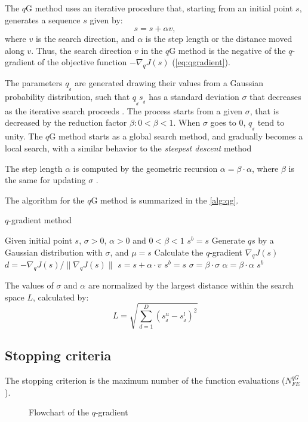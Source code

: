 The $q$G method uses an iterative procedure that, starting from an initial point $s$, generates a sequence $s$ given by:
%
\begin{equation}
s =  s + \alpha v,
\end{equation}
%
where $v$ is the search direction, and $\alpha$ is the step length or the distance moved along $v$. Thus, the search direction $v$ in the $q$G method is the negative of the $q$-gradient of the objective function $- \nabla_q J(s)$ (\autoref{eq:qgradient}).

The parameters $q_{_d}$ are generated drawing their values from a Gaussian probability distribution, such that $q_{_d} s_{_d}$ has a standard deviation $\sigma$ that decreases as the iterative search proceeds \cite{soterroni12a,soterroni13}. The process starts from a given $\sigma$, that is decreased by the reduction factor $\beta: 0 <\beta < 1$. When $\sigma$ goes to $0$, $q_{_d}$ tend to unity. The $q$G method starts as a global search method, and gradually becomes a local search, with a similar behavior to the \textit{steepest descent} method \cite{soterroni13}

The step length $\alpha$ is computed by the geometric recursion $\alpha = \beta \cdot \alpha$, where $\beta$ is the same for updating $\sigma$ \cite{soterroni12a,soterroni13}.

The algorithm for the $q$G method is summarized in the \autoref{alg:qg}.

\begin{algorithm}[H]
\caption{$q$-gradient method}
\label{alg:qg}
\footnotesize
\begin{algorithmic}[1]
\State Given initial point $s$, $\sigma>0$, $\alpha>0$ and $0< \beta < 1$
\State $s^b = s$
 
\State Generate $qs$ by a Gaussian distribution with $\sigma$, and $\mu=s$
\State Calculate the $q$-gradient $\nabla_q J(s)$
\State $d = - \nabla_q J(s) / \| \nabla_q J(s) \|$
\State $s = s + \alpha \cdot v$
\State $s^b = s$
\EndIf
\State $\sigma = \beta \cdot \sigma$
\State $\alpha = \beta \cdot \alpha$
\EndWhile
\State \Return $s^b$
\end{algorithmic}
\end{algorithm}

The values of $\sigma$ and $\alpha$ are normalized by the largest distance within the search space $L$, calculated by:
%
\begin{equation}
L=\sqrt{\sum_{d=1}^{D}(s^u_{_d}-s^l_{_d})^2}
\end{equation}

\subsection{Stopping criteria}

The stopping criterion is the maximum number of the function evaluations ($N_{FE}^{qG}$).

\begin{figure}[H]
\caption{Flowchart of the $q$-gradient}
\label{fig:qg}
\centering
\vspace{1em}
\end{figure}